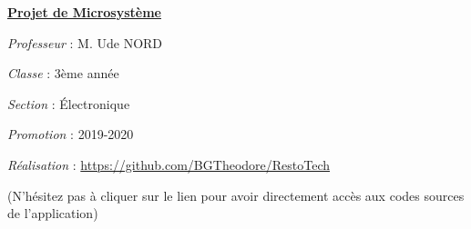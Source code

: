 \documentclass[a4paper,12pt]{report}
\begin{document}
\begin{center}
    \textbf{\underline{Projet de Microsystème}} \par 
    \textit{Professeur} : M. Ude NORD \par 
    \textit{Classe} : 3ème année \par 
    \textit{Section} : Électronique \par 
    \textit{Promotion} : 2019-2020 \par 
    \textit{Réalisation} : \url{https://github.com/BGTheodore/RestoTech}\par 
    (N'hésitez pas à cliquer sur le lien pour avoir directement accès aux codes 
    sources de l'application)
\end{center}


\tableofcontents


















\end{document}
